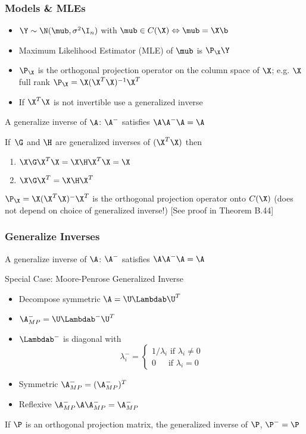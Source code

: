 \documentclass[handout]{beamer}
\begin{document}
\begin{frame} \frametitle{Models \& MLEs}
  \begin{itemize}
  \item   $\Y \sim \N(\mub, \sigma^2 \I_n)$ with $\mub \in C(\X)
    \Leftrightarrow \mub = \X \b$  \pause
  \item  Maximum Likelihood Estimator (MLE) of $\mub$ is
    $\P_\X \Y$  \pause
\item $\P_\X$ is the orthogonal projection operator on the column
  space of $\X$; e.g. $\X$ full rank $\P_\X = \X (\X^T\X)^{-1} \X^T$
  \pause
\item If $\X^T\X$ is not invertible use a generalized inverse
\end{itemize}
A generalize inverse of $\A$: $\A^{-}$ satisfies   $\A \A^- \A = \A$
\begin{lemma}[B.43]
  If $\, \G$ and $\H$ are generalized inverses of $(\X^T\X)$ then
  \begin{enumerate}
  \item $\X \G \X^T \X = \X \H \X^T \X = \X$
  \item $\X \G \X^T = \X \H \X^T$
  \end{enumerate}
\end{lemma} \pause
$\P_\X = \X (\X^T\X)^{-} \X^T$ is the orthogonal projection operator
onto $C(\X)$   (does not depend on choice of generalized inverse!)
[See proof in Theorem B.44]
\end{frame}
\begin{frame}
  \frametitle{Generalize Inverses}

A generalize inverse of $\A$: $\A^{-}$ satisfies   $\A \A^- \A = \A$


Special Case: Moore-Penrose Generalized Inverse  \pause


\begin{itemize}
\item Decompose symmetric $\A = \U \Lambdab \U^T$  \pause
\item $\A^-_{MP} = \U \Lambdab^- \U^T$  \pause
\item $\Lambdab^-$ is diagonal with $$ \lambda_i^- = \left\{
    \begin{array}{l}
   1/\lambda_i \text{ if } \lambda_i \neq 0 \\
   0 \quad \, \text{  if } \lambda_i = 0
    \end{array}
\right.$$  \pause
\item Symmetric  $\A^-_{MP} = (\A^-_{MP})^T $  \pause
\item Reflexive  $\A^-_{MP}\A \A^-_{MP} = \A^-_{MP} $  \pause
\end{itemize}

If $\P$ is an orthogonal projection matrix, the generalized inverse of
$\P$, $\P^- = \P$ 


\end{frame}
\end{document}
